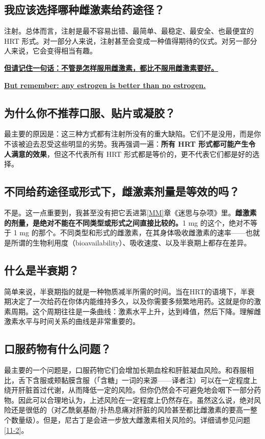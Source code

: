 \documentclass{article}
\begin{document}
\subsection{我应该选择哪种雌激素给药途径？}

注射。总体而言，注射是最不容易出错、最简单、最稳定、最安全、也最便宜的 HRT 形式。对一部分人来说，注射甚至会变成一种值得期待的仪式。对另一部分人来说，它会变得相当有趣。

\noindent\underline{\textbf{但请记住一句话：不管是怎样服用雌激素，都比不服用雌激素要好。}}

\noindent\underline{\textbf{But remember: any estrogen is better than no estrogen.}}

\subsection{为什么你不推荐口服、贴片或凝胶？}

最主要的原因是：这三种方式都有注射所没有的重大缺陷。它们不是没用，而是你不该被迫去忍受这些明显的劣势。我再强调一遍：\textbf{所有 HRT 形式都可能产生令人满意的效果}，但这不代表所有 HRT 形式都是等价的，更不代表它们都是好的选择。

\subsection{不同给药途径或形式下，雌激素剂量是等效的吗？}

不是。这一点重要到，我甚至没有把它丢进第\ref{MM}章《迷思与杂项》里。\textbf{雌激素的剂量，是绝对不能在不同类型或形式之间直接比较的。}1 mg 的这个，绝对不等于 1 mg 的那个。不同类型和形式的雌激素，在其身体吸收雌激素的速率——也就是所谓的生物利用度（bioavailability）、吸收速度、以及半衰期上都存在差异。

\subsection{什么是半衰期？}

简单来说，半衰期指的就是一种物质减半所需的时间。当在HRT的语境下，半衰期决定了一次给药在你体内能维持多久，以及你需要多频繁地用药。这就是你的激素周期。这个周期往往是一条曲线：激素水平上升，达到峰值，然后下降。理解雌激素水平与时间关系的曲线是非常重要的。

\subsection{口服药物有什么问题？}

最主要的一个问题是，口服药物它们会增加长期血栓和肝脏凝血风险。和吞服相比，舌下含服或颊黏膜含服（「含糖」一词的来源——译者注）可以在一定程度上绕开肝脏首过代谢，从而降低一定的风险。但你仍然会不可避免地会咽下一部分药物。因此可以合理地认为，上述风险在一定程度上仍然存在。虽然这么说，绝对风险还是很低的（对乙酰氨基酚/扑热息痛对肝脏的风险甚至都比雌激素的要高一整个数量级）。但是，尼古丁是会进一步放大雌激素相关风险的。详细请参见问题 \ref{11-2}。
\end{document}
